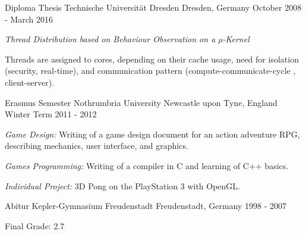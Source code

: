 \begin{cventries}
  \cventry
    {Diploma Thesis}
    {Technische Universität Dresden}
    {Dresden, Germany}
    {October 2008 - March 2016}
    {
      \begin{cvitems}
      \item {\textit{Thread Distribution based on Behaviour Observation on a
	µ-Kernel}}
      \item {Threads are assigned to cores, depending on their cache usage,
	  need for isolation (security, real-time), and communication pattern
	  (compute-communicate-cycle , client-server).}
      \end{cvitems}
    }
  \cventry
    {Erasmus Semester}
    {Nothrumbria University}
    {Newcastle upon Tyne, England}
    {Winter Term 2011 - 2012}
    {
      \begin{cvitems}
      \item {\textit{Game Design:} Writing of a game design document for an action
	adventure RPG, describing mechanics, user interface, and graphics.}
    \item {\textit{Games Programming:} Writing of a compiler in C and learning
        of C++ basics. }
    \item {\textit{Individual Project:} 3D Pong on the PlayStation 3 with OpenGL.}
      \end{cvitems}
    }
  \cventry
    {Abitur}
    {Kepler-Gymnasium Freudenstadt}
    {Freudenstadt, Germany}
    {1998 - 2007}
    {
      \begin{cvitems}
      \item {Final Grade: 2.7}
      \end{cvitems}
    }
\end{cventries}

